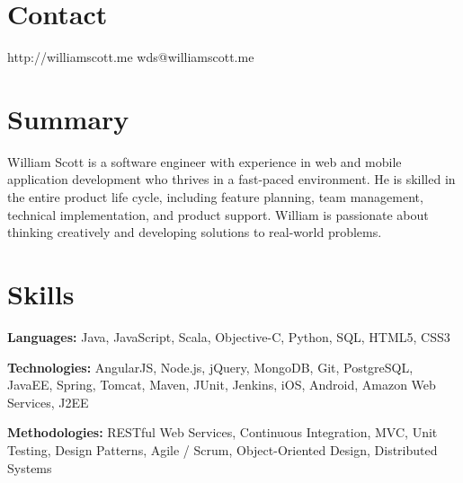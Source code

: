 \documentclass[margin,line]{resume}
\begin{document}
\begin{resume}
\vspace{-4mm}


  \section{\mysidestyle \textcolor{mySideColor}{Contact}}

  http://williamscott.me \hfill wds@williamscott.me




  \section{\mysidestyle \textcolor{mySideColor}{Summary}}

William Scott is a software engineer with experience in web and mobile application development who thrives in a fast-paced environment. He is skilled in the entire product life cycle, including feature planning, team management, technical implementation, and product support. William is passionate about thinking creatively and developing solutions to real-world problems.


  \section{\mysidestyle \textcolor{mySideColor}{Skills}}

  \textbf{Languages:} Java, JavaScript, Scala, Objective-C, Python, SQL, HTML5, CSS3
	\vspace{-2mm}

  \textbf{Technologies:} AngularJS, Node.js, jQuery, MongoDB, Git, PostgreSQL, JavaEE, Spring, Tomcat, Maven, JUnit, Jenkins, iOS, Android, Amazon Web Services, J2EE
	\vspace{-2mm}

  \textbf{Methodologies:} RESTful Web Services, Continuous Integration, MVC, Unit Testing, Design Patterns, Agile / Scrum, Object-Oriented Design, Distributed Systems
	\vspace{-2mm}


\end{resume}
\end{document}
